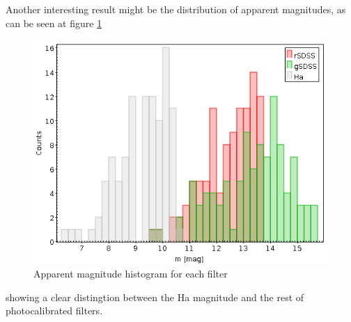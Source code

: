 \documentclass{aa}
\begin{document}
    Another interesting result might be the distribution of apparent magnitudes, as can be seen at figure \ref{fig: histogram}
    \begin{figure}[H]
        \centering
        \includegraphics[width=0.8\linewidth]{Images/mag_histo.png}
        \caption{Apparent magnitude histogram for each filter}
        \label{fig: histogram}
    \end{figure}
    showing a clear distingtion between the Ha magnitude and the rest of photocalibrated filters.
\end{document}
